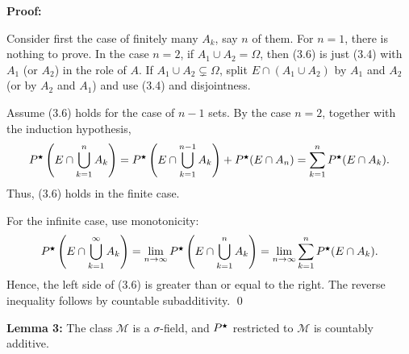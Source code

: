     \needspace{10ex}
    \textbf{Proof: }
    \vspace{-1ex}
    \begin{proofline}
        Consider first the case of finitely many \( A_k \), say \( n \) of them. For \( n = 1 \), there is nothing to prove. In the case \( n = 2 \), if \( A_1 \cup A_2 = \Omega \), then (3.6) is just (3.4) with \( A_1 \) (or \( A_2 \)) in the role of \( A \). If \( A_1 \cup A_2 \subsetneq \Omega \), split \( E \cap (A_1 \cup A_2) \) by \( A_1 \) and \( A_2 \) (or by \( A_2 \) and \( A_1 \)) and use (3.4) and disjointness.

        Assume (3.6) holds for the case of \( n - 1 \) sets. By the case \( n = 2 \), together with the induction hypothesis,
        \[
        P^{\medstar}\left( E \cap \bigcup_{k=1}^n A_k \right)
        = P^{\medstar}\left( E \cap \bigcup_{k=1}^{n-1} A_k \right) + P^{\medstar}(E \cap A_n)
        = \sum_{k=1}^n P^{\medstar}(E \cap A_k).
        \]
        Thus, (3.6) holds in the finite case.
        
        For the infinite case, use monotonicity:
        \[
        P^{\medstar}\left( E \cap \bigcup_{k=1}^\infty A_k \right)
        = \lim_{n \to \infty} P^{\medstar}\left( E \cap \bigcup_{k=1}^n A_k \right)
        = \lim_{n \to \infty} \sum_{k=1}^n P^{\medstar}(E \cap A_k).
        \]
        Hence, the left side of (3.6) is greater than or equal to the right.
        The reverse inequality follows by countable subadditivity. \hfill \qed
    \end{proofline}

    \needspace{10ex}
    \textbf{Lemma 3: } The class $\mathcal{M}$ is a $\sigma$-field, and $P^{\medstar}$ restricted to $\mathcal{M}$ is countably additive.

